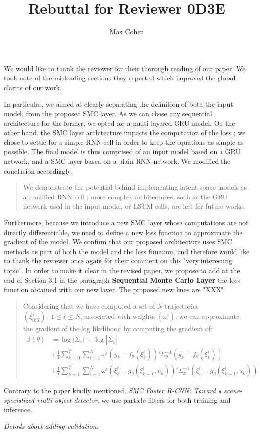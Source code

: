 \documentclass{article}
\title{Rebuttal for Reviewer 0D3E}
\author{Max Cohen}
\affil{Samovar, T\'el\'ecom SudParis, CITI, TIPIC, Institut Polyechnique de Paris}
\date{}
\begin{document}
\maketitle

We would like to thank the reviewer for their thorough reading of our paper.
We took note of the misleading sections they reported which improved the global clarity of our work.

In particular, we aimed at clearly separating the definition of both the input model, from the proposed SMC layer.
As we can chose any sequential architecture for the former, we opted for a multi layered GRU model.
On the other hand, the SMC layer architecture impacts the computation of the loss ; we chose to settle for a simple RNN cell in order to keep the equations as simple as possible.
The final model is thus comprised of an input model based on a GRU network, and a SMC layer based on a plain RNN network.
We modified the conclusion accordingly:
\begin{quote}
	We demonstrate the potential behind implementing latent space models as a modified RNN cell ;
	more complex architectures, such as the GRU network used in the input model, or LSTM cells, are left for future works.
\end{quote}

Furthermore, because we introduce a new SMC layer whose computations are not directly differentiable, we need to define a new loss function to approximate the gradient of the model.
We confirm that our proposed architecture uses SMC methods as part of both the model and the loss function, and therefore would like to thank the reviewer once again for their comment on this "very interesting topic".
In order to make it clear in the revised  paper, we propose to add at the end of Section 3.1 in the paragraph {\bf Sequential Monte Carlo Layer} the loss function obtained with our new layer.
The proposed new lines are "XXX"
\begin{quote}
	Considering that we have computed a set of $N$ trajectories $(\xi^i_{0:T}),\;1 \leq i \leq N$, associated with weights $(\omega^i)$, we can approximate the gradient of the log likelihood by computing the gradient of:
	\begin{align*}
		\mathbb{J}(\theta) & = \log |\Sigma_x| + \log |\Sigma_y|                                                                                                        \\
		                   & + \frac{1}{T}\sum_{k=0}^T \sum_{i=1}^N \omega^i (y_k - f_\theta(\xi_k^i))' \Sigma_y^{-1} (y_k - f_\theta(\xi_k^i))                         \\
		                   & + \frac{1}{T}\sum_{k=1}^T \sum_{i=1}^N \omega^i (\xi_k^i - g_\theta(\xi_{k-1}^i, u_k))'\Sigma_x^{-1}(\xi_k^i - g_\theta(\xi_{k-1}^i, u_k))
	\end{align*}

\end{quote}
Contrary to the paper kindly mentioned, \textit{SMC Faster R-CNN: Toward a scene-specialized multi-object detector}, we use particle filters for both training and inference.

\textit{Details about adding validation.}



\end{document}
